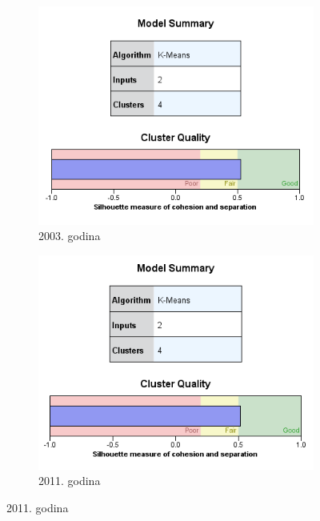 \documentclass[a4paper]{article}
\begin{document}
\begin{figure}[H]
	\begin{subfigure}[h]{\textwidth}
		\begin{center}
			\includegraphics[scale=0.50]{Klasterovanje/Model_KMeans2003_Silhouette.png}
		\end{center}
		\caption{2003. godina}
		\label{fig:SPSS_Silueta2003}
	\end{subfigure}

	\vspace{0.5cm}
	\begin{subfigure}[h]{\textwidth}
		\begin{center}
			\includegraphics[scale=0.50]{Klasterovanje/Model_KMeans2011_Silhouette.png}
		\end{center}
		\caption{2011. godina}
		\label{fig:SPSS_Silueta2011}
	\end{subfigure}
	

\end{figure}
\end{document}
